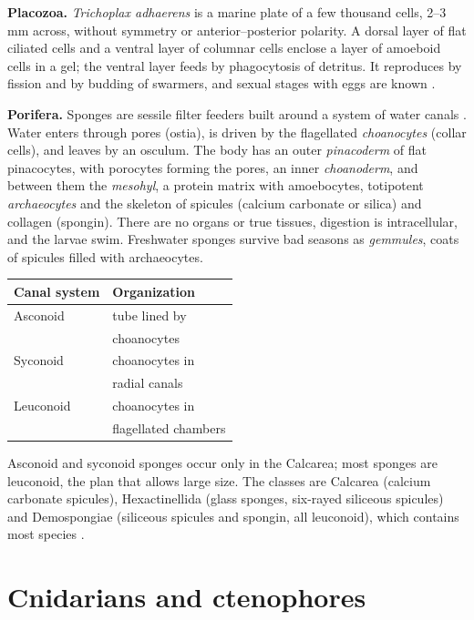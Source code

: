 \textbf{Placozoa.} \emph{Trichoplax
adhaerens} is a marine plate of a few
thousand cells, 2--3 mm across, without
symmetry or anterior--posterior polarity. A
dorsal layer of flat ciliated cells and a
ventral layer of columnar cells enclose a
layer of amoeboid cells in a gel; the ventral
layer feeds by phagocytosis of detritus. It
reproduces by fission and by budding of
swarmers, and sexual stages with eggs are
known \cite[Chapter
7]{brusca2003invertebrates}.

\textbf{Porifera.} Sponges are sessile filter
feeders built around a system of water canals
\cite[Chapter 6]{hickman2002animal}. Water
enters through pores (ostia), is driven by
the flagellated \emph{choanocytes} (collar
cells), and leaves by an osculum. The body
has an outer \emph{pinacoderm} of flat
pinacocytes, with porocytes forming the
pores, an inner \emph{choanoderm}, and
between them the \emph{mesohyl}, a protein
matrix with amoebocytes, totipotent
\emph{archaeocytes} and the skeleton of
spicules (calcium carbonate or silica) and
collagen (spongin). There are no organs or
true tissues, digestion is intracellular, and
the larvae swim. Freshwater sponges survive
bad seasons as \emph{gemmules}, coats of
spicules filled with archaeocytes.

\begin{center}
\begin{tabular}{ll}
Canal system & Organization \\
\hline
Asconoid & tube lined by \\
& choanocytes \\
Syconoid & choanocytes in \\
& radial canals \\
Leuconoid & choanocytes in \\
& flagellated chambers \\
\end{tabular}
\end{center}

Asconoid and syconoid sponges occur only in
the Calcarea; most sponges are leuconoid, the
plan that allows large size. The classes are
Calcarea (calcium carbonate spicules),
Hexactinellida (glass sponges, six-rayed
siliceous spicules) and Demospongiae
(siliceous spicules and spongin, all
leuconoid), which contains most species
\cite[Chapter 6]{hickman2002animal}.

\section{Cnidarians and ctenophores}
\label{section-radiata}

